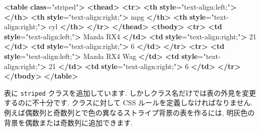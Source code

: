 \documentclass[
  11pt,
  lualatex,ja=standard,jafont=noto]{bxjsreport}
\newenvironment{Shaded}{\begin{snugshade}}{\end{snugshade}}
\newcommand{\ErrorTok}[1]{\textcolor[rgb]{0.64,0.00,0.00}{\textbf{#1}}}
\newcommand{\KeywordTok}[1]{\textcolor[rgb]{0.13,0.29,0.53}{\textbf{#1}}}
\newcommand{\NormalTok}[1]{#1}
\newcommand{\OtherTok}[1]{\textcolor[rgb]{0.56,0.35,0.01}{#1}}
\newcommand{\StringTok}[1]{\textcolor[rgb]{0.31,0.60,0.02}{#1}}
\begin{document}
\begin{Shaded}
\begin{Highlighting}[]
\KeywordTok{\textless{}table} \ErrorTok{class}\OtherTok{=}\StringTok{"striped"}\KeywordTok{\textgreater{}}
 \KeywordTok{\textless{}thead\textgreater{}}
  \KeywordTok{\textless{}tr\textgreater{}}
   \KeywordTok{\textless{}th} \ErrorTok{style}\OtherTok{=}\StringTok{"text{-}align:left;"}\KeywordTok{\textgreater{}}   \KeywordTok{\textless{}/th\textgreater{}}
   \KeywordTok{\textless{}th} \ErrorTok{style}\OtherTok{=}\StringTok{"text{-}align:right;"}\KeywordTok{\textgreater{}}\NormalTok{ mpg }\KeywordTok{\textless{}/th\textgreater{}}
   \KeywordTok{\textless{}th} \ErrorTok{style}\OtherTok{=}\StringTok{"text{-}align:right;"}\KeywordTok{\textgreater{}}\NormalTok{ cyl }\KeywordTok{\textless{}/th\textgreater{}}
  \KeywordTok{\textless{}/tr\textgreater{}}
 \KeywordTok{\textless{}/thead\textgreater{}}
\KeywordTok{\textless{}tbody\textgreater{}}
  \KeywordTok{\textless{}tr\textgreater{}}
   \KeywordTok{\textless{}td} \ErrorTok{style}\OtherTok{=}\StringTok{"text{-}align:left;"}\KeywordTok{\textgreater{}}\NormalTok{ Mazda RX4 }\KeywordTok{\textless{}/td\textgreater{}}
   \KeywordTok{\textless{}td} \ErrorTok{style}\OtherTok{=}\StringTok{"text{-}align:right;"}\KeywordTok{\textgreater{}}\NormalTok{ 21 }\KeywordTok{\textless{}/td\textgreater{}}
   \KeywordTok{\textless{}td} \ErrorTok{style}\OtherTok{=}\StringTok{"text{-}align:right;"}\KeywordTok{\textgreater{}}\NormalTok{ 6 }\KeywordTok{\textless{}/td\textgreater{}}
  \KeywordTok{\textless{}/tr\textgreater{}}
  \KeywordTok{\textless{}tr\textgreater{}}
   \KeywordTok{\textless{}td} \ErrorTok{style}\OtherTok{=}\StringTok{"text{-}align:left;"}\KeywordTok{\textgreater{}}\NormalTok{ Mazda RX4 Wag }\KeywordTok{\textless{}/td\textgreater{}}
   \KeywordTok{\textless{}td} \ErrorTok{style}\OtherTok{=}\StringTok{"text{-}align:right;"}\KeywordTok{\textgreater{}}\NormalTok{ 21 }\KeywordTok{\textless{}/td\textgreater{}}
   \KeywordTok{\textless{}td} \ErrorTok{style}\OtherTok{=}\StringTok{"text{-}align:right;"}\KeywordTok{\textgreater{}}\NormalTok{ 6 }\KeywordTok{\textless{}/td\textgreater{}}
  \KeywordTok{\textless{}/tr\textgreater{}}
\KeywordTok{\textless{}/tbody\textgreater{}}
\KeywordTok{\textless{}/table\textgreater{}}
\end{Highlighting}
\end{Shaded}

表に \texttt{striped} クラスを追加しています. しかしクラス名だけでは表の外見を変更するのに不十分です. クラスに対して CSS ルールを定義しなければなりません. 例えば偶数列と奇数列とで色の異なるストライプ背景の表を作るには, 明灰色の背景を偶数または奇数列に追加できます.
\end{document}
